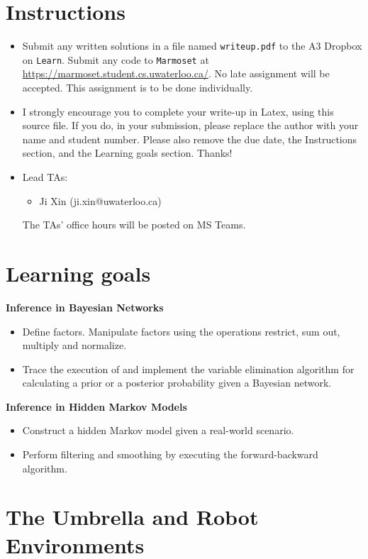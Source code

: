 \documentclass[12pt]{article}
\begin{document}
\newpage
\section*{Instructions}

\begin{itemize}
\item
Submit any written solutions in a file named \verb+writeup.pdf+ to the A3 Dropbox on \verb+Learn+. Submit any code to \verb+Marmoset+ at \url{https://marmoset.student.cs.uwaterloo.ca/}. 
No late assignment will be accepted. This assignment is to be done individually.

\item 
I strongly encourage you to complete your write-up in Latex, using this source file. If you do, in your submission, please replace the author with your name and student number. Please also remove the due date, the Instructions section, and the Learning goals section. Thanks!

\item
Lead TAs: 
\begin{itemize}
\item
Ji Xin (ji.xin@uwaterloo.ca)
\end{itemize}
The TAs' office hours will be posted on MS Teams.
\end{itemize}


\section*{Learning goals}

{\bf Inference in Bayesian Networks}
\begin{itemize}
\item
Define factors. Manipulate factors using the operations restrict, sum out, multiply and normalize.
\item
Trace the execution of and implement the variable elimination algorithm for calculating a prior or a posterior probability given a Bayesian network.
\end{itemize}

{\bf Inference in Hidden Markov Models}
\begin{itemize}
\item
Construct a hidden Markov model given a real-world scenario.
\item 
Perform filtering and smoothing by executing the forward-backward algorithm.
\end{itemize}


\newpage
\section*{The Umbrella and Robot Environments}
\end{document}
